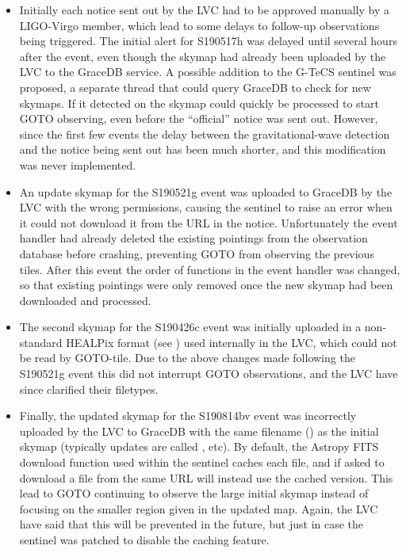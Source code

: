 \begin{colsection}
\begin{colsection}
\begin{itemize}
    \item Initially each notice sent out by the LVC had to be approved manually by a LIGO-Virgo member, which lead to some delays to follow-up observations being triggered. The initial alert for S190517h was delayed until several hours after the event, even though the skymap had already been uploaded by the LVC to the GraceDB service. A possible addition to the G-TeCS sentinel was proposed, a separate thread that could query GraceDB to check for new skymaps. If it detected on the skymap could quickly be processed to start GOTO observing, even before the ``official'' notice was sent out. However, since the first few events the delay between the gravitational-wave detection and the notice being sent out has been much shorter, and this modification was never implemented.
    \item An update skymap for the S190521g event was uploaded to GraceDB by the LVC with the wrong permissions, causing the sentinel to raise an error when it could not download it from the URL in the notice. Unfortunately the event handler had already deleted the existing pointings from the observation database before crashing, preventing GOTO from observing the previous tiles. After this event the order of functions in the event handler was changed, so that existing pointings were only removed once the new skymap had been downloaded and processed.
    \item The second skymap for the S190426c event was initially uploaded in a non-standard HEALPix format (see ) used internally in the LVC, which could not be read by GOTO-tile. Due to the above changes made following the S190521g event this did not interrupt GOTO observations, and the LVC have since clarified their filetypes.
    \item Finally, the updated skymap for the S190814bv event was incorrectly uploaded by the LVC to GraceDB with the same filename () as the initial skymap (typically updates are called , etc). By default, the Astropy FITS download function used within the sentinel caches each file, and if asked to download a file from the same URL will instead use the cached version. This lead to GOTO continuing to observe the large initial skymap instead of focusing on the smaller region given in the updated map. Again, the LVC have said that this will be prevented in the future, but just in case the sentinel was patched to disable the caching feature.
\end{itemize}

\end{colsection}


\end{colsection}

